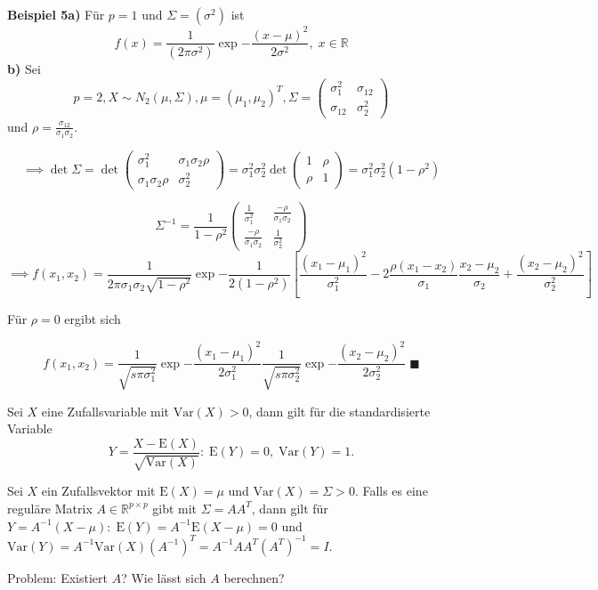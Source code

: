 \documentclass[12pt, a4paper]{article}
\newcommand{\E}{\mbox{I\negthinspace E}}
\theoremstyle{plain}
\theoremstyle{definition}
\newcommand{\R}{\mathbb{R}}
\newcommand{\1}{\mathds{1}}
\renewcommand{\E}{\mathrm{E}}
\newcommand{\Var}{\mathrm{Var}}
\begin{document}
\textbf{Beispiel 5a)} Für $p = 1$ und $\Sigma = (\sigma^2)$ ist 
\[  f(x) = \frac{1}{(2\pi \sigma^2)} \exp{- \frac{(x-\mu)^2}{2\sigma^2}} , \; x \in \R  \]
\textbf{b)} Sei \[p = 2, X \sim N_2 (\mu, \Sigma), \mu = (\mu_1, \mu_2)^T, \Sigma = \begin{pmatrix} \sigma_1^2 & \sigma_{12} \\ \sigma_{12}&\sigma_2^2 \end{pmatrix}\] und $\rho = \frac{\sigma_{12}}{\sigma_1 \sigma_2}$.

\[  \implies \det \Sigma = \det \begin{pmatrix} \sigma_1^2 & \sigma_1 \sigma_2 \rho \\ \sigma_1 \sigma_2 \rho & \sigma_2^2   \end{pmatrix}  = \sigma_1^2 \sigma_2^2 \det \begin{pmatrix}  1 & \rho \\ \rho & 1 \end{pmatrix} = \sigma_1^2 \sigma_2^2 (1-\rho^2)  \]


\[  \Sigma^{-1} = \frac{1}{1-\rho^2}   \begin{pmatrix} \frac{1}{\sigma_1^2} & \frac{-\rho}{\sigma_1 \sigma_2} \\ \frac{-\rho}{\sigma_1 \sigma_2} & \frac{1}{\sigma_2^2}    \end{pmatrix}    \]
\[  \implies f(x_1, x_2) = \frac{1}{2 \pi \sigma_1 \sigma_2 \sqrt{1-\rho^2} } \exp{ - \frac{1}{2(1-\rho^2)} [ \frac{(x_1 - \mu_1)^2 }{\sigma_1^2} -2\frac{\rho(x_1- x_2)}{\sigma_1} \frac{x_2 - \mu_2}{\sigma_2} + \frac{(x_2 - \mu_2)^2}{\sigma_2^2} ]    }   \]

Für $\rho = 0$ ergibt sich

\[ f(x_1, x_2) = \frac{1}{\sqrt{s \pi \sigma_1^2}} \exp{ - \frac{(x_1 - \mu_1)^2}{2 \sigma_1^2} } \frac{1}{\sqrt{s \pi \sigma_2^2}} \exp{ - \frac{(x_2 - \mu_2)^2}{2 \sigma_2^2} } \; \blacksquare     \]


Sei $X$ eine Zufallsvariable mit $\Var(X)>0$, dann gilt für die standardisierte Variable
\[   Y = \frac{X - \E(X)}{\sqrt{\Var(X)}}: \; \E(Y) = 0, \; \Var(Y) = 1.   \]


Sei $X$ ein Zufallsvektor mit $\E(X) = \mu$ und $\Var(X) = \Sigma > 0$. Falls es eine reguläre Matrix $A \in \R^{p \times p} $ gibt mit $\Sigma = AA^T$, dann gilt für $Y = A^{-1} (X - \mu): \; \E(Y) = A^{-1} \E(X - \mu) = 0$ und $\Var(Y) = A^{-1} \Var (X) (A^{-1})^T = A^{-1} A A^T (A^T)^{-1} = I$.

Problem: Existiert $A$? Wie lässt sich $A$ berechnen?
\end{document}
